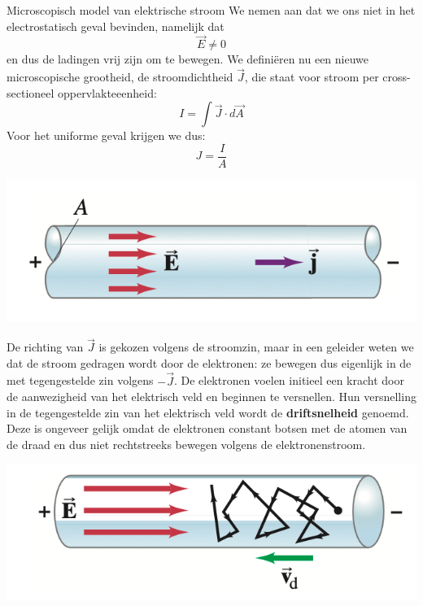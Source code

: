 \begin{app}{Microscopisch model van elektrische stroom}
    We nemen aan dat we ons niet in het electrostatisch geval bevinden, namelijk dat
    \begin{equation*}
        \Vec{E} \neq 0
    \end{equation*}
    en dus de ladingen vrij zijn om te bewegen. We definiëren nu een nieuwe microscopische grootheid, de stroomdichtheid $\Vec{J}$, die staat voor stroom per cross-sectioneel oppervlakteeenheid: 
    \begin{equation*}
        I = \int \Vec{J} \cdot d\Vec{A}
    \end{equation*}
    Voor het uniforme geval krijgen we dus:
    \begin{equation*}
        J = \dfrac{I}{A}
    \end{equation*}
    \begin{center}
        \includegraphics[scale = 0.5]{Images/Elektriciteit/MicroscopischStroom.png}
    \end{center}
    De richting van $\Vec{J}$ is gekozen volgens de stroomzin, maar in een geleider weten we dat de stroom gedragen wordt door de elektronen: ze bewegen dus eigenlijk in de met tegengestelde zin volgens $-\Vec{J}$. De elektronen voelen initieel een kracht door de aanwezigheid van het elektrisch veld en beginnen te versnellen. Hun versnelling in de tegengestelde zin van het elektrisch veld wordt de \textbf{driftsnelheid} genoemd. Deze is ongeveer gelijk omdat de elektronen constant botsen met de atomen van de draad en dus niet rechtstreeks bewegen volgens de elektronenstroom.
    \begin{center}
        \includegraphics[scale = 0.53]{Images/Elektriciteit/Driftsnelheid.png}

\end{center}
\end{app}
